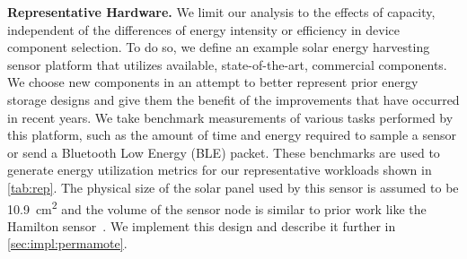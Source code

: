 \vspace{-6pt}
\noindent
\textbf{Representative Hardware.}
We limit our analysis to the effects of capacity,
independent of the differences of energy intensity or efficiency in device
component selection. To do so, we define an example solar energy harvesting
sensor platform that utilizes available, state-of-the-art, commercial
components.
We choose new
components in an attempt to better represent prior energy storage designs and
give them the benefit of the improvements that have occurred in recent years.
We take benchmark
measurements of various tasks performed by this platform, such as the
amount of time and energy required to sample a sensor or send a Bluetooth Low
Energy (BLE) packet. These benchmarks are used to generate energy utilization metrics
for our representative workloads shown in \cref{tab:rep}.
The physical size of the solar panel used by this sensor
is assumed to be
10.9~cm\textsuperscript{2} and the volume of the sensor node is similar to prior
work like the Hamilton sensor~\cite{kim2018system}.
We implement this design and describe it further in \cref{sec:impl:permamote}.
\\

